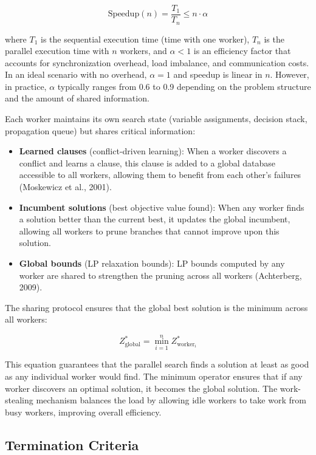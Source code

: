 \documentclass[12pt,a4paper]{article}
\begin{document}
\begin{equation}
\text{Speedup}(n) = \frac{T_1}{T_n} \leq n \cdot \alpha
\end{equation}

where $T_1$ is the sequential execution time (time with one worker), $T_n$ is the parallel execution time with $n$ workers, and $\alpha < 1$ is an efficiency factor that accounts for synchronization overhead, load imbalance, and communication costs. In an ideal scenario with no overhead, $\alpha = 1$ and speedup is linear in $n$. However, in practice, $\alpha$ typically ranges from 0.6 to 0.9 depending on the problem structure and the amount of shared information.

Each worker maintains its own search state (variable assignments, decision stack, propagation queue) but shares critical information:
\begin{itemize}
\item \textbf{Learned clauses} (conflict-driven learning): When a worker discovers a conflict and learns a clause, this clause is added to a global database accessible to all workers, allowing them to benefit from each other's failures (Moskewicz et al., 2001).
\item \textbf{Incumbent solutions} (best objective value found): When any worker finds a solution better than the current best, it updates the global incumbent, allowing all workers to prune branches that cannot improve upon this solution.
\item \textbf{Global bounds} (LP relaxation bounds): LP bounds computed by any worker are shared to strengthen the pruning across all workers (Achterberg, 2009).
\end{itemize}

The sharing protocol ensures that the global best solution is the minimum across all workers:

\begin{equation}
Z^*_{\text{global}} = \min_{i=1}^{n} Z^*_{\text{worker}_i}
\end{equation}

This equation guarantees that the parallel search finds a solution at least as good as any individual worker would find. The minimum operator ensures that if any worker discovers an optimal solution, it becomes the global solution. The work-stealing mechanism balances the load by allowing idle workers to take work from busy workers, improving overall efficiency.

\subsection{Termination Criteria}
\end{document}
